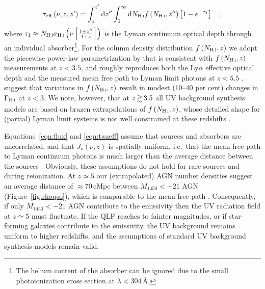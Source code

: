 \documentclass[fleqn,usenatbib]{mnras}
\begin{document}
\begin{equation}
  \tau_\mathrm{eff}\left(\nu,z,z^\prime\right) = \int_{z}^{z^\prime}\mathrm{d}z^{\prime\prime}\int_0^\infty
  \mathrm{d}N_\ion{H}{i} f\left(N_\ion{H}{i},z^{\prime\prime}\right)\left[1-e^{-\tau_1}\right]\quad,
   \label{eqn:taueff}
\end{equation}
where $\tau_1\approx
N_\ion{H}{i}\sigma_\ion{H}{i}\left(\nu\left[\frac{1+z^{\prime\prime}}{1+z}\right]\right)$
is the Lyman continuum optical depth through an individual
absorber\footnote{The helium content of the absorber can be ignored
  due to the small  photoionization cross section at
  $\lambda<304$\,\AA.}.  For the  column density
distribution $f\left(N_\ion{H}{i},z\right)$ we adopt the piecewise
power-law parametrization by \citet{2012ApJ...746..125H} that is
consistent with $f\left(N_\ion{H}{i},z\right)$ measurements at
$z<3.5$, and roughly reproduces both the  Ly$\alpha$
effective optical depth \citep[but not in detail --
  see][]{2015MNRAS.450.4081P,2017MNRAS.464..897B,2017ApJ...837..106O}
and the measured mean free path to  Lyman limit photons at
$z<5.5$ \citep{2009ApJ...705L.113P,2014MNRAS.445.1745W}.
\citet{2018arXiv180109693K} suggest that variations in
$f\left(N_\ion{H}{i},z\right)$ result in modest (10--40 per cent)
changes in $\Gamma_\ion{H}{i}$ at $z<3$. We note, however, that at
$z\ga 3.5$ all UV background synthesis models are based on brazen
extrapolations of $f\left(N_\ion{H}{i},z\right)$, whose detailed shape
for (partial) Lyman limit systems is not well constrained at these
redshifts \citep{2010ApJ...718..392P}.

Equations~\eqref{eqn:flux} and \eqref{eqn:taueff} assume that sources
and absorbers are uncorrelated, and that $J_\nu(\nu, z)$ is spatially
uniform, i.e.\ that the mean free path to  Lyman continuum
photons is much larger than the average distance between the sources
\citep[e.g.][]{1999ApJ...514..648M,2004MNRAS.350.1107M,2009ApJ...703.1416F,2012ApJ...746..125H}.
Obviously, these assumptions do not hold for rare sources and during
 reionization.  At $z\simeq 5$ our (extrapolated) AGN number
densities suggest an average distance of $\approx 70$\,cMpc between
$M_{1450}<-21$ AGN (Figure~\ref{fig:rhoqso}), which is comparable to
the mean free path \citep[$83\pm 10$\,cMpc,][]{2014MNRAS.445.1745W}.
Consequently, if only $M_{1450}<-21$ AGN contribute to the emissivity
then the UV radiation field at $z\simeq 5$ must fluctuate.  If the QLF
reaches to fainter magnitudes, or if star-forming galaxies contribute
to the emissivity, the UV background remains uniform to higher
redshifts, and the assumptions of standard UV background synthesis
models remain valid.
\end{document}
